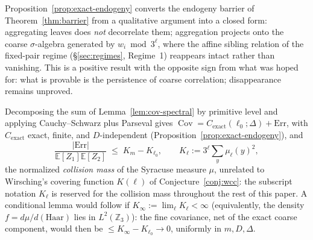 \documentclass[11pt]{article}
\theoremstyle{definition}
\theoremstyle{remark}
\DeclareMathOperator{\Cov}{Cov}
\begin{document}
Proposition~\ref{prop:exact-endogeny} converts the endogeny barrier of
Theorem~\ref{thm:barrier} from a qualitative argument into a closed
form: aggregating leaves does \emph{not} decorrelate them; aggregation
projects onto the coarse $\sigma$-algebra generated by $w_i\bmod
3^\ell$, where the affine sibling relation of the fixed-pair regime
(\S\ref{sec:regimes}, Regime~1) reappears intact rather than vanishing.
This is a positive result with the opposite sign from what was hoped
for: what is provable is the persistence of coarse correlation;
disappearance remains unproved.

Decomposing the sum of Lemma~\ref{lem:cov-spectral} by primitive level
and applying Cauchy--Schwarz plus Parseval gives $\Cov =
C_{\mathrm{exact}}(\ell_0;\Delta) + \mathrm{Err}$, with
$C_{\mathrm{exact}}$ exact, finite, and $D$-independent
(Proposition~\ref{prop:exact-endogeny}), and
\[
  \frac{|\mathrm{Err}|}{\mathbb{E}[Z_1]\mathbb{E}[Z_2]} \;\le\;
  K_m - K_{\ell_0}, \qquad K_\ell := 3^\ell \sum_y \mu_\ell(y)^2,
\]
the normalized \emph{collision mass} of the Syracuse measure $\mu$,
unrelated to Wirsching's covering function $K(\ell)$ of
Conjecture~\ref{conj:wcc}: the subscript notation $K_\ell$ is reserved
for the collision mass throughout the rest of this paper. A
conditional lemma would follow if $K_\infty := \lim_\ell K_\ell <
\infty$ (equivalently, the density $f=d\mu/d(\text{Haar})$ lies in
$L^2(\mathbb{Z}_3)$): the fine covariance, net of the exact coarse
component, would then be $\le K_\infty - K_{\ell_0}\to 0$, uniformly in
$m,D,\Delta$.
\end{document}

